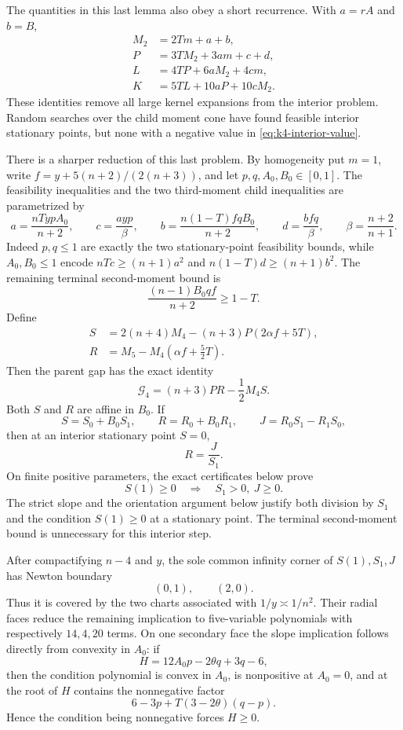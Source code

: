\documentclass[11pt]{article}
\theoremstyle{remark}
\begin{document}
The quantities in this last lemma also obey a short recurrence.  With
\(a=rA\) and \(b=B\),
\begin{align*}
 M_2&=2Tm+a+b,\\
 P&=3TM_2+3am+c+d,\\
 L&=4TP+6aM_2+4cm,\\
 K&=5TL+10aP+10cM_2.
\end{align*}
These identities remove all large kernel expansions from the interior
problem.  Random searches over the child moment cone have found feasible
interior stationary points, but none with a negative value in
\eqref{eq:k4-interior-value}.

There is a sharper reduction of this last problem.  By homogeneity put
\(m=1\), write \(f=y+5(n+2)/(2(n+3))\), and let
\(p,q,A_0,B_0\in[0,1]\).  The feasibility inequalities and the two
third-moment child inequalities are parametrized by
\[
 a=\frac{nTypA_0}{n+2},\qquad
 c=\frac{ayp}{\beta},\qquad
 b=\frac{n(1-T)fqB_0}{n+2},\qquad
 d=\frac{bfq}{\beta},
 \qquad \beta=\frac{n+2}{n+1}.
\]
Indeed \(p,q\leq1\) are exactly the two stationary-point feasibility
bounds, while \(A_0,B_0\leq1\) encode
\(nTc\geq(n+1)a^2\) and
\(n(1-T)d\geq(n+1)b^2\).  The remaining terminal second-moment bound is
\[
             \frac{(n-1)B_0qf}{n+2}\geq1-T.
\]
Define
\[
\begin{split}
 S&=2(n+4)M_4-(n+3)P(2\alpha f+5T),\\
 R&=M_5-M_4\left(\alpha f+\frac52T\right).
\end{split}
\]
Then the parent gap has the exact identity
\[
 \mathcal G_4=(n+3)PR-\frac12M_4S.
\]
Both \(S\) and \(R\) are affine in \(B_0\).  If
\[
 S=S_0+B_0S_1,\qquad R=R_0+B_0R_1,\qquad
 J=R_0S_1-R_1S_0,
\]
then at an interior stationary point \(S=0\),
\[
                         R=\frac{J}{S_1}.
\]
On finite positive parameters, the exact certificates below prove
\[
             S(1)\geq0\quad\Longrightarrow\quad S_1>0,\ J\geq0.
\]
The strict slope and the orientation argument below justify both division
by $S_1$ and the condition $S(1)\geq0$ at a stationary point. The terminal
second-moment bound is unnecessary for this interior step.

After compactifying \(n-4\) and \(y\), the sole common infinity corner of
\(S(1),S_1,J\) has Newton boundary
\[
                         (0,1),\qquad(2,0).
\]
Thus it is covered by the two charts associated with
\(1/y\asymp1/n^2\).  Their radial faces reduce the remaining implication to
five-variable polynomials with respectively \(14,4,20\) terms.  On one
secondary face the slope implication follows directly from convexity in
\(A_0\): if
\[
 H=12A_0p-2\theta q+3q-6,
\]
then the condition polynomial is convex in \(A_0\), is nonpositive at
\(A_0=0\), and at the root of \(H\) contains the nonnegative factor
\[
                6-3p+T(3-2\theta)(q-p).
\]
Hence the condition being nonnegative forces \(H\geq0\).
\end{document}
